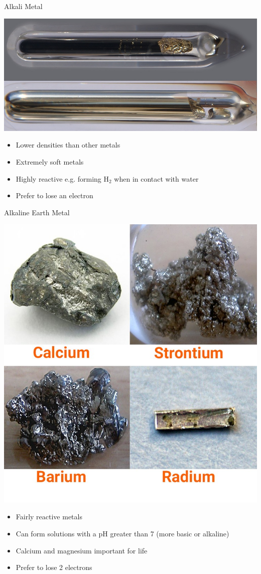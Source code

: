 \documentclass[11pt]{beamer}
\begin{document}
\begin{frame}{Alkali Metal}
  \begin{center}
    \includegraphics[scale=0.2]{alkali_metal}
  \end{center}
  
  \begin{itemize}
  \item Lower densities than other metals
  \item Extremely soft metals
  \item Highly reactive e.g. forming H$_2$ when in
    contact with water
  \item Prefer to lose an electron
  \end{itemize}
\end{frame}

\begin{frame}{Alkaline Earth Metal}
  \begin{center}
    \includegraphics[width=0.4\linewidth]{alkaline_metal}
  \end{center}
  
  \begin{itemize}
  \item Fairly reactive metals
  \item Can form solutions with a pH greater than
    7 (more basic or alkaline)
  \item Calcium and magnesium important for life
  \item Prefer to lose 2 electrons
  \end{itemize}
\end{frame}
\end{document}

